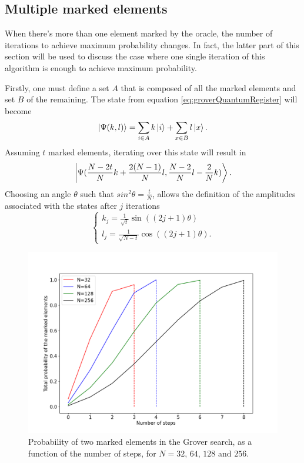 \documentclass[../../dissertation.tex]{subfiles}
\begin{document}
\subsection{Multiple marked elements}
When there's more than one element marked by the oracle, the number of
iterations to achieve maximum probability changes. In fact, the latter part of
this section will be used to discuss the case where one single iteration of
this algorithm is enough to achieve maximum probability.\par 

Firstly, one must define a set $A$ that is composed of all the marked elements
and set $B$ of the remaining. The state from equation
\ref{eq:groverQuantumRegister} will become
\begin{equation}
	\ket{\Psi(k,l)} =\sum_{i\in A} k\ket{i} + \sum_{x \in B}l\ket{x}.
\end{equation}
Assuming $t$ marked elements, iterating over this state will result in
\begin{equation}
	\ket{\Psi(\frac{N-2t}{N}k + \frac{2(N-1)}{N}l, \frac{N-2}{N}l - \frac{2}{N}k)}.
\end{equation}
Choosing an angle $\theta$ such that $sin^2\theta=\frac{t}{N}$, allows the
definition of the amplitudes associated with the states after $j$ iterations 
\begin{equation}
	\begin{cases}
		k_{j} =\frac{1}{\sqrt{t}} \sin{((2j+1)\theta)} 
		\\l_{j} = \frac{1}{\sqrt{N-t}}\cos{((2j+1)\theta)}.
	\end{cases}\label{eq:groverKandJ2}
\end{equation}
\begin{figure}[h]
	\centering
	\includegraphics[scale=0.40]{img/Grover/GroverMultipleMarked3264128256}
	\caption{Probability of two marked elements in the Grover search, as a function of the number of steps, for $N=32$, $64$, $128$ and $256$.} 
	\label{fig:groverMultipleMarked3264128256}
\end{figure}
\end{document}
